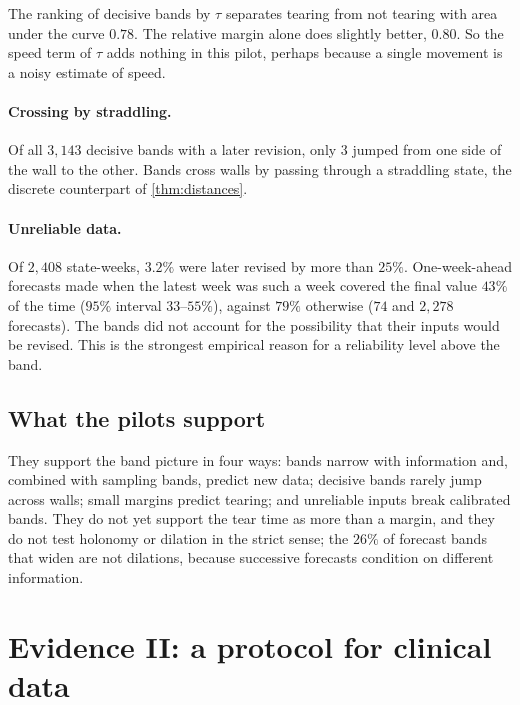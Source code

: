 \documentclass[11pt]{article}
\theoremstyle{definition}
\theoremstyle{remark}
\begin{document}
The ranking of decisive bands by $\tau$ separates tearing from not tearing with area under the curve $0.78$. The relative margin
alone does slightly better, $0.80$. So the speed term of $\tau$ adds nothing in this pilot, perhaps because a single movement is
a noisy estimate of speed.

\paragraph{Crossing by straddling.} Of all $3{,}143$ decisive bands with a later revision, only $3$ jumped from one side of the wall to the
other. Bands cross walls by passing through a straddling state, the discrete counterpart of \cref{thm:distances}.

\paragraph{Unreliable data.} Of $2{,}408$ state-weeks, $3.2\%$ were later revised by more than $25\%$. One-week-ahead forecasts made when
the latest week was such a week covered the final value $43\%$ of the time ($95\%$ interval $33$--$55\%$), against $79\%$ otherwise
($74$ and $2{,}278$ forecasts). The bands did not account for the possibility that their inputs would be revised. This is the strongest empirical
reason for a reliability level above the band.

\subsection{What the pilots support}

They support the band picture in four ways: bands narrow with information and, combined with sampling bands, predict new data;
decisive bands rarely jump across walls; small margins predict tearing; and unreliable inputs break calibrated bands. They do
not yet support the tear time as more than a margin, and they do not test holonomy or dilation in the strict sense; the $26\%$ of
forecast bands that widen are not dilations, because successive forecasts condition on different information.

\section{Evidence II: a protocol for clinical data}\label{sec:protocol}
\end{document}
